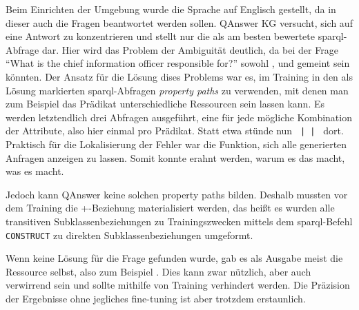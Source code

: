 Beim Einrichten der Umgebung wurde die Sprache auf Englisch gestellt, da in dieser auch die Fragen beantwortet werden sollen.
QAnswer KG versucht, sich auf eine Antwort zu konzentrieren und stellt nur die als am besten bewertete \ac{sparql}-Abfrage dar.
Hier wird das Problem der Ambiguität deutlich, da bei der Frage \enquote{What is the chief information officer responsible for?} sowohl
,  und  gemeint sein könnten.
Der Ansatz für die Lösung dises Problems war es, im Training in den als Lösung markierten \ac{sparql}-Abfragen \emph{property paths} zu verwenden,
mit denen man zum Beispiel das Prädikat unterschiedliche Ressourcen sein lassen kann.
Es werden letztendlich drei Abfragen ausgeführt, eine für jede mögliche Kombination der Attribute, also hier einmal pro Prädikat.
Statt etwa \texttt{} stünde nun \texttt{ |  | } dort.
Praktisch für die Lokalisierung der Fehler war die Funktion, sich alle generierten Anfragen anzeigen zu lassen.
Somit konnte erahnt werden, warum es das macht, was es macht.

Jedoch kann QAnswer keine solchen property paths bilden.
Deshalb mussten vor dem Training die +-Beziehung materialisiert werden,
das heißt es wurden alle transitiven Subklassenbeziehungen zu Trainingszwecken mittels dem \ac{sparql}-Befehl \texttt{CONSTRUCT} zu direkten Subklassenbeziehungen umgeformt.

Wenn keine Lösung für die Frage gefunden wurde, gab es als Ausgabe meist die Ressource selbst, also zum Beispiel .
Dies kann zwar nützlich, aber auch verwirrend sein und sollte mithilfe von Training verhindert werden.
Die Präzision der Ergebnisse ohne jegliches fine-tuning ist aber trotzdem erstaunlich.

